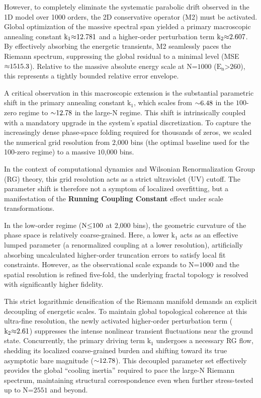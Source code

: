 \documentclass[fleqn,10pt]{wlscirep}
\begin{document}
However, to completely eliminate the systematic parabolic drift observed
in the 1D model over 1000 orders, the 2D conservative operator (M2) must
be activated. Global optimization of the massive spectral span yielded a
primary macroscopic annealing constant
\(\text{k}_{\text{1}}\text{\ensuremath{\approx}12.781}\) and a higher-order perturbation
term \(\text{k}_{\text{2}}\text{\ensuremath{\approx}2.607}\). By effectively absorbing the
energetic transients, M2 seamlessly paces the Riemann spectrum,
suppressing the global residual to a minimal level (MSE
\(\text{\ensuremath{\approx}1515.3}\)). Relative to the massive absolute energy scale at
\(\text{N}\text{=1000}\) (\(\text{E}_{\text{n}}\text{>260}\)), this
represents a tightly bounded relative error envelope.

A critical observation in this macroscopic extension is the substantial
parametric shift in the primary annealing constant
\(\text{k}_{\text{1}}\), which scales from \(\text{\ensuremath{\sim}6.48}\) in the
\(\text{100}\)-zero regime to \(\text{\ensuremath{\sim}12.78}\) in the large-N
regime. This shift is intrinsically coupled with a mandatory upgrade in
the system's spatial discretization. To capture the increasingly dense
phase-space folding required for thousands of zeros, we scaled the
numerical grid resolution from \(\text{2,000}\) bins (the optimal
baseline used for the 100-zero regime) to a massive \(\text{10,000}\)
bins.

In the context of computational dynamics and Wilsonian Renormalization
Group (RG) theory, this grid resolution acts as a strict ultraviolet
(UV) cutoff. The parameter shift is therefore not a symptom of localized
overfitting, but a manifestation of the \textbf{Running
Coupling Constant} effect under scale transformations.

In the low-order regime (\(\text{N}\text{\ensuremath{\le}100}\) at \(\text{2,000}\)
bins), the geometric curvature of the phase space is relatively
coarse-grained. Here, a lower \(\text{k}_{\text{1}}\) acts as an
effective lumped parameter (a renormalized coupling at a lower
resolution), artificially absorbing uncalculated higher-order truncation
errors to satisfy local fit constraints. However, as the observational
scale expands to \(\text{N}\text{=1000}\) and the spatial resolution is
refined five-fold, the underlying fractal topology is resolved with
significantly higher fidelity.

This strict logarithmic densification of the Riemann manifold demands an
explicit decoupling of energetic scales. To maintain global topological
coherence at this ultra-fine resolution, the newly activated
higher-order perturbation term (\(\text{k}_{\text{2}}\text{\ensuremath{\approx}2.61}\))
suppresses the intense nonlinear transient fluctuations near the ground
state. Concurrently, the primary driving term \(\text{k}_{\text{1}}\)
undergoes a necessary RG flow, shedding its localized coarse-grained
burden and shifting toward its true asymptotic bare magnitude
(\(\text{\ensuremath{\sim}12.78}\)). This decoupled parameter set effectively provides
the global ``cooling inertia'' required to pace the large-N
Riemann spectrum, maintaining structural correspondence even when further
stress-tested up to \(\text{N}\text{=2551}\) and beyond.
\end{document}
